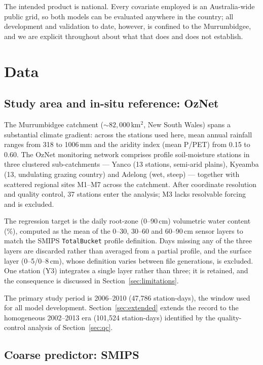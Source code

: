 \documentclass[11pt,a4paper]{article}
\begin{document}
The intended product is national. Every covariate employed is an
Australia-wide public grid, so both models can be evaluated anywhere in the
country; all development and validation to date, however, is confined to the
Murrumbidgee, and we are explicit throughout about what that does and does not
establish.

\section{Data}\label{sec:data}

\subsection{Study area and in-situ reference: OzNet}\label{sec:oznet}

The Murrumbidgee catchment (${\sim}82{,}000$\,km$^2$, New South Wales) spans a
substantial climate gradient: across the stations used here, mean annual
rainfall ranges from 318 to 1006\,mm and the aridity index (mean P/PET) from
0.15 to 0.60. The OzNet monitoring network \citep{smith2012oznet} comprises
profile soil-moisture stations in three clustered sub-catchments --- Yanco (13
stations, semi-arid plains), Kyeamba (13, undulating grazing country) and
Adelong (wet, steep) --- together with scattered regional sites M1--M7 across
the catchment. After coordinate resolution and quality control, 37 stations
enter the analysis; M3 lacks resolvable forcing and is excluded.

The regression target is the daily root-zone (0--90\,cm) volumetric water
content (\%), computed as the mean of the 0--30, 30--60 and 60--90\,cm sensor
layers to match the SMIPS \texttt{TotalBucket} profile definition. Days
missing any of the three layers are discarded rather than averaged from a
partial profile, and the surface layer (0--5/0--8\,cm), whose definition
varies between file generations, is excluded. One station (Y3) integrates a
single layer rather than three; it is retained, and the consequence is
discussed in Section~\ref{sec:limitations}.

The primary study period is 2006--2010 (47{,}786 station-days), the window
used for all model development. Section~\ref{sec:extended} extends the record
to the homogeneous 2002--2013 era (101{,}524 station-days) identified by the
quality-control analysis of Section~\ref{sec:qc}.

\subsection{Coarse predictor: SMIPS}\label{sec:smips}
\end{document}

